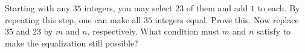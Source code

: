 Starting with any $35$ integers, you may select $23$ of them and add $1$ to each. By repeating this step, one can make all $35$ integers equal. Prove this. Now replace $35$ and $23$ by $m$ and $n$, respectively. What condition must $m$ and $n$ satisfy to make the equalization still possible?
